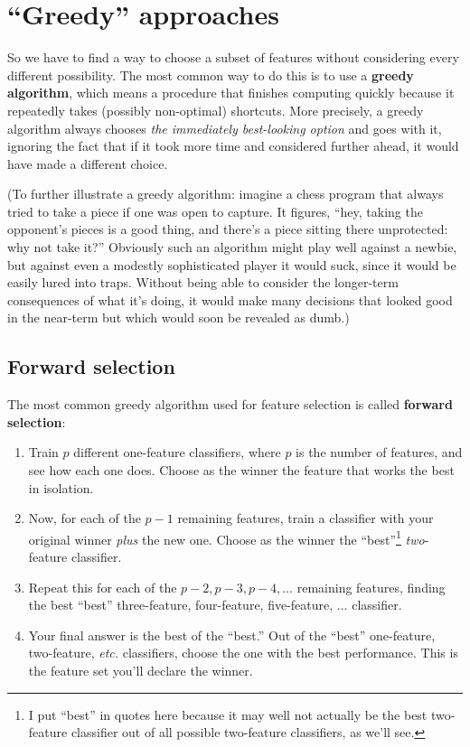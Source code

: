 \section{``Greedy'' approaches}

So we have to find a way to choose a subset of features without considering
every different possibility. The most common way to do this is to use a
\textbf{greedy algorithm}, which means a procedure that finishes computing
quickly because it repeatedly takes (possibly non-optimal) shortcuts. More
precisely, a greedy algorithm always chooses \textit{the immediately
best-looking option} and goes with it, ignoring the fact that if it took more
time and considered further ahead, it would have made a different choice.

(To further illustrate a greedy algorithm: imagine a chess program that always
tried to take a piece if one was open to capture. It figures, ``hey, taking
the opponent's pieces is a good thing, and there's a piece sitting there
unprotected: why not take it?'' Obviously such an algorithm might play well
against a newbie, but against even a modestly sophisticated player it would
suck, since it would be easily lured into traps. Without being able to
consider the longer-term consequences of what it's doing, it would make many
decisions that looked good in the near-term but which would soon be revealed
as dumb.)

\subsection{Forward selection}

The most common greedy algorithm used for feature selection is called
\textbf{forward selection}:

\begin{enumerate}
\itemsep.1em
\item Train $p$ different one-feature classifiers, where $p$ is the number of
features, and see how each one does. Choose as the winner the feature that
works the best in isolation.
\item Now, for each of the $p-1$ remaining features, train a classifier with
your original winner \textit{plus} the new one. Choose as the winner the
``best''\footnote{I put ``best'' in quotes here because it may well not actually
be the best two-feature classifier out of all possible two-feature
classifiers, as we'll see.} \textit{two}-feature classifier.
\item Repeat this for each of the $p-2, p-3, p-4, \dots$ remaining features,
finding the best ``best'' three-feature, four-feature, five-feature, $\dots$
classifier.
\item Your final answer is the best of the ``best.'' Out of the ``best''
one-feature, two-feature, \textit{etc.} classifiers, choose the one with the
best performance. This is the feature set you'll declare the winner.
\end{enumerate}

